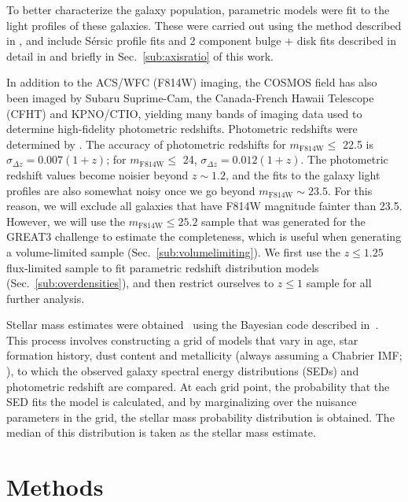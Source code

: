 \documentclass[twocolumn,useAMS,usenatbib]{mn2e}
\newcommand{\sersic}{S\'{e}rsic }
\begin{document}
To better characterize the galaxy population, parametric models were
fit to the light profiles of these galaxies.  These were carried out
using the method described in \cite{Claire_Fits}, and include
\sersic profile fits and 
2 component bulge $+$ disk fits described in detail in \cite{great3}
and briefly in Sec.~\ref{sub:axisratio} of this work.  

In addition to the ACS/WFC (F814W) imaging, the COSMOS field has also been imaged by Subaru Suprime-Cam, the
Canada-French Hawaii Telescope (CFHT) and KPNO/CTIO, yielding many bands
of imaging data used to determine high-fidelity photometric
redshifts. 
Photometric redshifts were determined by
\cite{COSMOS_Photoz_30band}. The accuracy of photometric redshifts for
$m_\text{F814W}\le$ 22.5 is $\sigma_{\Delta z} = 0.007(1+z)$; for $m_\text{F814W}\le$ 24, $\sigma_{\Delta z} = 0.012(1+z)$.
The photometric redshift values become noisier beyond $z\sim 1.2$, and
the  fits to the galaxy light profiles are also somewhat noisy once we
go beyond $m_\text{F814W}\sim 23.5$.   
For this reason, we will exclude all galaxies that have F814W
magnitude fainter than 23.5. However, we will use the
$m_\text{F814W}\le 25.2$ sample that was generated for the GREAT3
challenge to estimate the completeness, which is useful when
generating a volume-limited sample (Sec.~\ref{sub:volumelimiting}).
We first use the $z\le1.25$ flux-limited sample to fit parametric redshift
distribution models (Sec.~\ref{sub:overdensities}), and then
restrict ourselves to $z\le1$ sample for all further analysis. 

Stellar mass estimates were obtained~\citep{COSMOS_XRAY} using the
Bayesian code described in~\cite{KEVIN_MSTAR}.  This process involves
constructing a grid of models that vary in age, star formation
history, dust content and metallicity (always assuming a Chabrier IMF;
\citealt{ChabrierIMF}), 
 to which the observed galaxy spectral energy distributions (SEDs) and photometric redshift are compared. At each grid point, the probability that the 
SED fits the model is calculated, and by marginalizing over the nuisance parameters in the grid, the stellar mass probability distribution is obtained. The median of this distribution
is taken as the stellar mass estimate. 
  
\section{Methods}
\label{S:methods}
\end{document}
